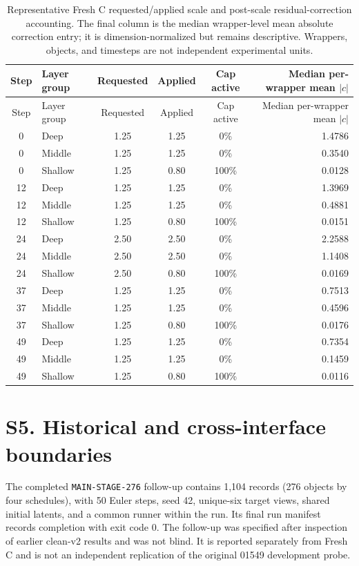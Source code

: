 \documentclass[11pt]{article}
\begin{document}
\begingroup\scriptsize
\begin{longtable}{c l c c c r}
\caption{Representative Fresh C requested/applied scale and post-scale residual-correction accounting. The final column is the median wrapper-level mean absolute correction entry; it is dimension-normalized but remains descriptive. Wrappers, objects, and timesteps are not independent experimental units.}\label{tab:supp-execution}\\
\toprule Step & Layer group & Requested & Applied & Cap active & Median per-wrapper mean $|c|$ \\
\midrule\endfirsthead
\toprule Step & Layer group & Requested & Applied & Cap active & Median per-wrapper mean $|c|$ \\
\midrule\endhead
0 & Deep & 1.25 & 1.25 & 0\% & 1.4786 \\
0 & Middle & 1.25 & 1.25 & 0\% & 0.3540 \\
0 & Shallow & 1.25 & 0.80 & 100\% & 0.0128 \\
12 & Deep & 1.25 & 1.25 & 0\% & 1.3969 \\
12 & Middle & 1.25 & 1.25 & 0\% & 0.4881 \\
12 & Shallow & 1.25 & 0.80 & 100\% & 0.0151 \\
24 & Deep & 2.50 & 2.50 & 0\% & 2.2588 \\
24 & Middle & 2.50 & 2.50 & 0\% & 1.1408 \\
24 & Shallow & 2.50 & 0.80 & 100\% & 0.0169 \\
37 & Deep & 1.25 & 1.25 & 0\% & 0.7513 \\
37 & Middle & 1.25 & 1.25 & 0\% & 0.4596 \\
37 & Shallow & 1.25 & 0.80 & 100\% & 0.0176 \\
49 & Deep & 1.25 & 1.25 & 0\% & 0.7354 \\
49 & Middle & 1.25 & 1.25 & 0\% & 0.1459 \\
49 & Shallow & 1.25 & 0.80 & 100\% & 0.0116 \\
\bottomrule
\end{longtable}

\endgroup

\section*{S5. Historical and cross-interface boundaries}
The completed \texttt{MAIN-STAGE-276} follow-up contains 1,104 records (276 objects by four schedules), with 50 Euler steps, seed 42, unique-six target views, shared initial latents, and a common runner within the run. Its final run manifest records completion with exit code 0. The follow-up was specified after inspection of earlier clean-v2 results and was not blind. It is reported separately from Fresh C and is not an independent replication of the original 01549 development probe.
\end{document}
